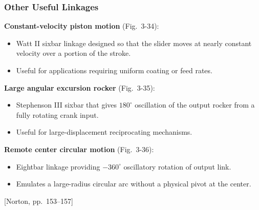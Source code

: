 \documentclass[10pt,aspectratio=43]{beamer}
\newcommand{\pref}[1]{\vfill\hfill{\scriptsize\color{gray}[Norton, pp.~#1]}}
\begin{document}

\begin{frame}
\frametitle{Other Useful Linkages}

\textbf{Constant-velocity piston motion} (Fig.~3-34):
\begin{itemize}
  \item Watt II sixbar linkage designed so that the slider moves at nearly constant velocity over a portion of the stroke.
  \item Useful for applications requiring uniform coating or feed rates.
\end{itemize}

\vspace{6pt}
\textbf{Large angular excursion rocker} (Fig.~3-35):
\begin{itemize}
  \item Stephenson III sixbar that gives $180^\circ$ oscillation of the output rocker from a fully rotating crank input.
  \item Useful for large-displacement reciprocating mechanisms.
\end{itemize}

\vspace{6pt}
\textbf{Remote center circular motion} (Fig.~3-36):
\begin{itemize}
  \item Eightbar linkage providing $-360^\circ$ oscillatory rotation of output link.
  \item Emulates a large-radius circular arc without a physical pivot at the center.
\end{itemize}
\pref{153--157}
\end{frame}

\end{document}
